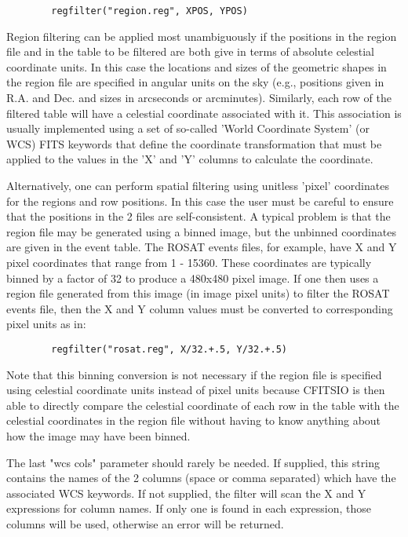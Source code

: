 \documentclass[11pt]{book}
\begin{document}
\begin{verbatim}
        regfilter("region.reg", XPOS, YPOS)
\end{verbatim}
    Region filtering can be applied most unambiguously if the positions
    in the region file and in the table to be filtered are both give in
    terms of absolute celestial coordinate units.  In this case the
    locations and sizes of the geometric shapes in the region file are
    specified in angular units on the sky (e.g., positions given in
    R.A. and Dec.  and sizes in arcseconds or arcminutes).  Similarly,
    each row of the filtered table will have a celestial coordinate
    associated with it.  This association is usually implemented using
    a set of so-called 'World Coordinate System' (or WCS) FITS keywords
    that define the coordinate transformation that must be applied to
    the values in the 'X' and 'Y' columns to calculate the coordinate.

    Alternatively, one can perform spatial filtering using unitless
    'pixel' coordinates for the regions and row positions.  In this
    case the user must be careful to ensure that the positions in the 2
    files are self-consistent.  A typical problem is that the region
    file may be generated using a binned image, but the unbinned
    coordinates are given in the event table.  The ROSAT events files,
    for example, have X and Y pixel coordinates that range from 1 -
    15360.  These coordinates are typically binned by a factor of 32 to
    produce a 480x480 pixel image.  If one then uses a region file
    generated from this image (in image pixel units) to filter the
    ROSAT events file, then the X and Y column values must be converted
    to corresponding pixel units as in:

\begin{verbatim}
        regfilter("rosat.reg", X/32.+.5, Y/32.+.5)
\end{verbatim}
    Note that this binning conversion is not necessary if the region
    file is specified using celestial coordinate units instead of pixel
    units because CFITSIO is then able to directly compare the
    celestial coordinate of each row in the table with the celestial
    coordinates in the region file without having to know anything
    about how the image may have been binned.

    The last "wcs cols" parameter should rarely be needed. If supplied,
    this  string contains the names of the 2 columns (space or comma
    separated) which have the associated WCS keywords. If not supplied,
    the filter  will scan the X  and Y expressions for column names.
    If only one is found in each  expression, those columns will be
    used, otherwise an error will be returned.
\end{document}
